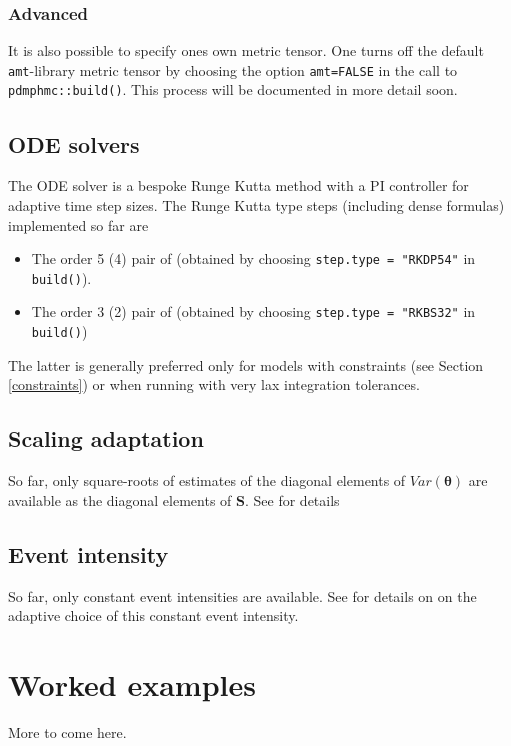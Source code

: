 \documentclass[
]{book}
\providecommand{\tightlist}{%
  \setlength{\itemsep}{0pt}\setlength{\parskip}{0pt}}
\begin{document}
\hypertarget{advanced}{%
\subsection{Advanced}\label{advanced}}

It is also possible to specify ones own metric tensor. One turns off the default \texttt{amt}-library metric tensor by choosing the option \texttt{amt=FALSE} in the call to \texttt{pdmphmc::build()}. This process will be documented in more detail soon.

\hypertarget{ODE-solvers}{%
\section{ODE solvers}\label{ODE-solvers}}

The ODE solver is a bespoke Runge Kutta method with a PI controller for adaptive time step sizes. The Runge Kutta type steps (including dense formulas) implemented so far are

\begin{itemize}
\tightlist
\item
  The order 5 (4) pair of \citet{DORMAND198019} (obtained by choosing \texttt{step.type\ =\ "RKDP54"} in \texttt{build()}).
\item
  The order 3 (2) pair of \citet{BOGACKI1989321} (obtained by choosing \texttt{step.type\ =\ "RKBS32"} in \texttt{build()})
\end{itemize}

The latter is generally preferred only for models with constraints (see Section \ref{constraints}) or when running with
very lax integration tolerances.

\hypertarget{scaling-adaptation}{%
\section{Scaling adaptation}\label{scaling-adaptation}}

So far, only square-roots of estimates of the diagonal elements of \(Var(\boldsymbol \theta)\) are available as the diagonal elements of \(\mathbf S\). See \citet{kleppe_CTHMC} for details

\hypertarget{event-intensity}{%
\section{Event intensity}\label{event-intensity}}

So far, only constant event intensities are available. See \citet{kleppe_CTHMC} for details on on the adaptive choice of this constant event intensity.

\hypertarget{worked-examples}{%
\chapter{Worked examples}\label{worked-examples}}

More to come here.

  
\end{document}
